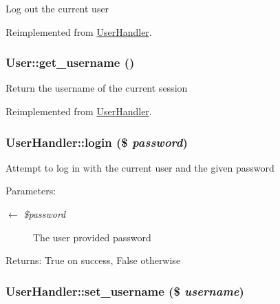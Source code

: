 Log out the current user 

Reimplemented from \hyperlink{classUserHandler_8000feaceda9d3c37fc56b6d1969b8f7}{UserHandler}.\hypertarget{classUser_1348ddf190d4df2518665fb51305a902}{
\subsubsection{\setlength{\rightskip}{0pt plus 5cm}User::get\_\-username ()}}
\label{classUser_1348ddf190d4df2518665fb51305a902}


Return the username of the current session 

Reimplemented from \hyperlink{classUserHandler_76e8c8b88c8d92f2d03645e810b9253c}{UserHandler}.\hypertarget{classUserHandler_7a0b269a54d9430f48d6490c1fe14ecd}{
\subsubsection{\setlength{\rightskip}{0pt plus 5cm}UserHandler::login (\$ {\em password})}}
\label{classUserHandler_7a0b269a54d9430f48d6490c1fe14ecd}


Attempt to log in with the current user and the given password

\begin{Desc}
\item[Parameters:]
\begin{description}
\item[\mbox{$\leftarrow$} {\em \$password}]The user provided password \end{description}
\end{Desc}
\begin{Desc}
\item[Returns:]True on success, False otherwise \end{Desc}
\hypertarget{classUserHandler_fbcc9a275b547cca0bd4cff567b054a0}{
\subsubsection{\setlength{\rightskip}{0pt plus 5cm}UserHandler::set\_\-username (\$ {\em username})}}
\label{classUserHandler_fbcc9a275b547cca0bd4cff567b054a0}


